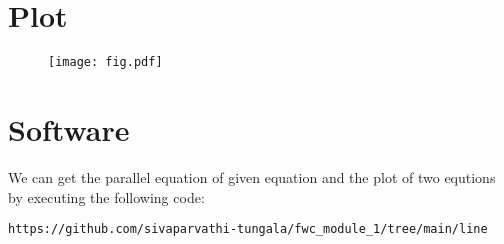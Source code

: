    \section{Plot}
\begin{figure}
       \centering
\texttt{[image: fig.pdf]}
       \label{fig:my_label}
\end{figure}

\section{Software}
  We can get the parallel equation of given equation and the plot of two equtions by executing the following code:
 \vspace{1mm} 
\begin{lstlisting}
https://github.com/sivaparvathi-tungala/fwc_module_1/tree/main/line
\end{lstlisting}
\